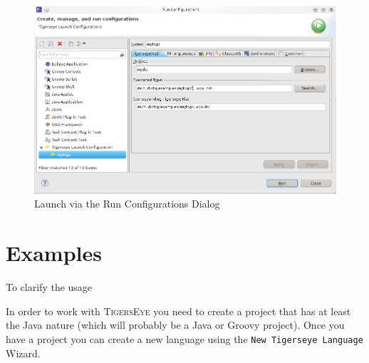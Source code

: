 \documentclass[article,colorback,accentcolor=tud4c]{tudreport}
\newcommand\tiger{%
  \textsc{TigersEye}
}
\begin{document}
\begin{figure}
 \centering
 \includegraphics[scale=.5]{./pics/launch_run_configurations_dialog.png}
 \caption{Launch via the Run Configurations Dialog}
 \label{fig:launch_run_configurations_dialog}
\end{figure}


	

  \section{Examples}\label{sec:examples}
  
  To clarify the usage 

In order to work with \tiger you need to create a project that has at least the Java nature (which will probably be a Java or Groovy project). Once you have a project you can create a new language using the \texttt{New Tigerseye Language} Wizard. 


  \appendix

  \listoffigures{}
\end{document}
